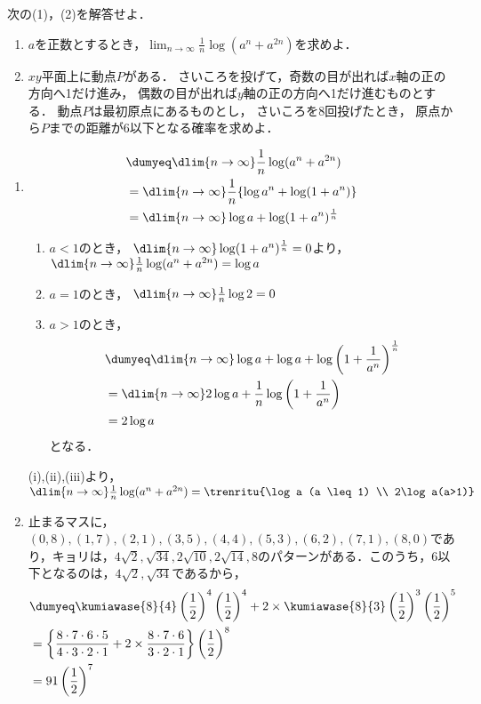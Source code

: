 \begin{problem}
  次の(1)，(2)を解答せよ．
\begin{enumerate}
\item $a$を正数とするとき，$\displaystyle\lim_{n\to\infty}\frac{1}{n}\log(a^n+a^{2n})$を求めよ．
\item $xy$平面上に動点$P$がある．
さいころを投げて，奇数の目が出れば$x$軸の正の方向へ1だけ進み，
偶数の目が出れば$y$軸の正の方向へ1だけ進むものとする．
動点$P$は最初原点にあるものとし，
さいころを8回投げたとき，
原点から$P$までの距離が6以下となる確率を求めよ．
\end{enumerate}
\end{problem}

\begin{enumerate}
  \item \begin{align*}
    &\dumyeq \dlim{n\to\infty} \frac{1}{n}\log(a^n+a^{2n}) \\
    &= \dlim{n\to\infty} \frac{1}{n}\{\log a^n + \log (1+a^n)\} \\
    &= \dlim{n\to\infty} \log a + \log (1+a^n)^{\frac{1}{n}}
  \end{align*}
  \begin{enumerate}
    \item $a<1$のとき，
      $\dlim{n\to\infty} \log (1+a^n)^{\frac{1}{n}} = 0$より，
      $\dlim{n\to\infty} \frac{1}{n} \log (a^n + a^{2n}) = \log a$

    \item $a=1$のとき，
      $\dlim{n\to\infty} \frac{1}{n}\log 2 = 0$

    \item $a>1$のとき，
    \begin{align*}
      &\dumyeq \dlim{n\to\infty} \log a + \log a + \log \left( 1+\frac{1}{a^n} \right)^{\frac{1}{n}} \\
      &= \dlim{n\to\infty}2\log a + \frac{1}{n}\log \left(1+\frac{1}{a^n} \right) \\
      &= 2\log a
    \end{align*}
    となる．
  \end{enumerate}
  (i),(ii),(iii)より，$\dlim{n\to\infty} \frac{1}{n}\log(a^n+a^{2n}) = \trenritu{\log a (a \leq 1) \\ 2\log a(a>1)}$

  \item 止まるマスに，$(0,8),(1,7),(2,1),(3,5),(4,4),(5,3),(6,2),(7,1),(8,0)$であり，キョリは，$4\sqrt2, \sqrt{34},2\sqrt{10},2\sqrt{14},8$のパターンがある．このうち，6以下となるのは，$4\sqrt2,\sqrt{34}$であるから，
  \begin{align*}
    &\dumyeq \kumiawase{8}{4}\left( \frac12 \right)^4\left( \frac12 \right)^4+2\times \kumiawase{8}{3} \left( \frac12 \right)^3 \left( \frac12 \right)^5 \\
    &= \left\{ \frac{8\cdot 7\cdot 6\cdot 5}{4\cdot 3\cdot 2\cdot 1} + 2\times \frac{8\cdot 7\cdot 6}{3\cdot 2\cdot 1} \right\}\left( \frac12 \right)^8 \\
    &= 91 \left( \frac{1}{2} \right)^7
  \end{align*}

\end{enumerate}
